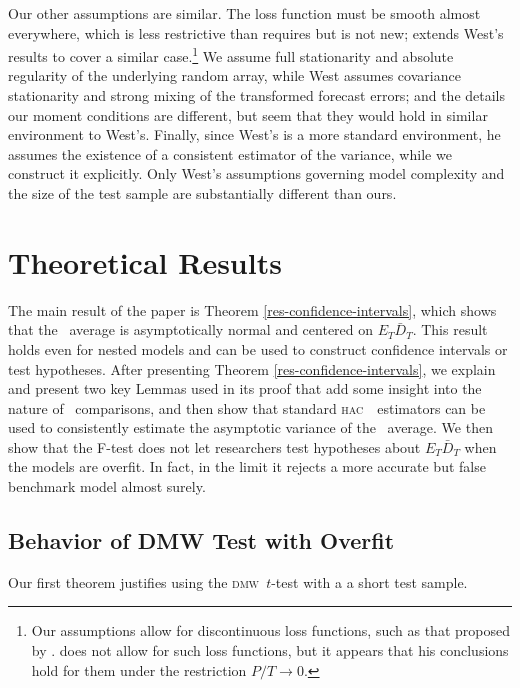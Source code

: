 \documentclass[11pt]{article}
\newcommand{\oosB}{\bar{D}_{T}}
\newcommand{\dmw}{\textsc{dmw}}
\newcommand{\hac}{\textsc{hac}}
\begin{document}
Our other assumptions are similar.  The loss function must be smooth
almost everywhere, which is less restrictive than \citet{Wes:96}
requires but is not new; \citet{Mcc:00} extends West's results to
cover a similar case.\footnote{Our assumptions allow for discontinuous
  loss functions, such as that proposed by \citet{PeT:92}.
  \citet{Mcc:07} does not allow for such loss functions, but it
  appears that his conclusions hold for them under the restriction
  $P/T \to 0$.}  We assume full stationarity and absolute regularity
of the underlying random array, while West assumes covariance
stationarity and strong mixing of the transformed forecast errors; and
the details our moment conditions are different, but seem that they
would hold in similar environment to West's.  Finally, since West's is
a more standard environment, he assumes the existence of a consistent
estimator of the variance, while we construct it explicitly.  Only
West's assumptions governing model complexity and the size of the test
sample are substantially different than ours.

\section{Theoretical Results}\label{sec:theory}
The main result of the paper is Theorem
\ref{res-confidence-intervals}, which shows that the \oos\ average is
asymptotically normal and centered on $E_T \oosB$.  This result
holds even for nested models and can be used to construct confidence
intervals or test hypotheses.  After presenting Theorem
\ref{res-confidence-intervals}, we explain and present two key Lemmas
used in its proof that add some insight into the nature of \oos\
comparisons, and then show that standard \hac\ \oos\ estimators can be
used to consistently estimate the asymptotic variance of the \oos\
average.  We then show that the F-test does not let researchers test
hypotheses about $E_{T} \oosB$ when the models are overfit.  In
fact, in the limit it rejects a more accurate but false benchmark
model almost surely.

\subsection{Behavior of DMW Test with Overfit}\label{sec:oostheory}
Our first theorem justifies using the \dmw\ $t$-test with a a short
test sample.
\end{document}
